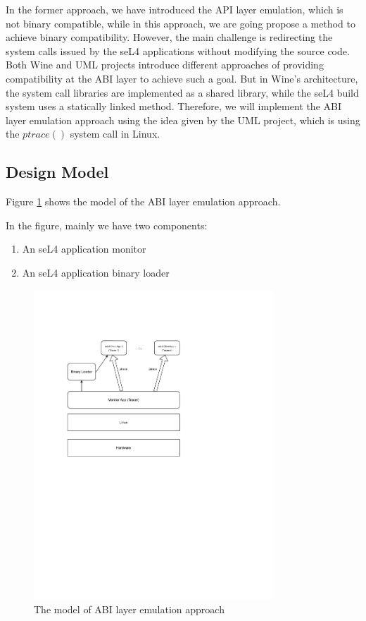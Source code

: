 
In the former approach, we have introduced the API layer emulation, which is not binary compatible, while in this approach, we are going propose a method to achieve binary compatibility. However, the main challenge is redirecting the system calls issued by the seL4 applications without modifying the source code. Both Wine and UML projects introduce different approaches of providing compatibility at the ABI layer to achieve such a goal. But in Wine's architecture, the system call libraries are implemented as a shared library, while the seL4 build system uses a statically linked method. Therefore, we will implement the ABI layer emulation approach using the idea given by the UML project, which is using the $ptrace()$ system call in Linux.

\subsection{Design Model} 

Figure \ref{fig:mabi} shows the model of the ABI layer emulation approach.

In the figure, mainly we have two components:

\begin{enumerate}
    \item An seL4 application monitor
    \item An seL4 application binary loader 
\end{enumerate}

\begin{figure}[h]
    \centering
    \includegraphics[clip, trim=0.5cm 12cm 6cm 3cm, width=0.8\textwidth, height=0.8\textwidth]{ch3/model2-v2.pdf}
    \caption{The model of ABI layer emulation approach}
    \label{fig:mabi}
\end{figure}


